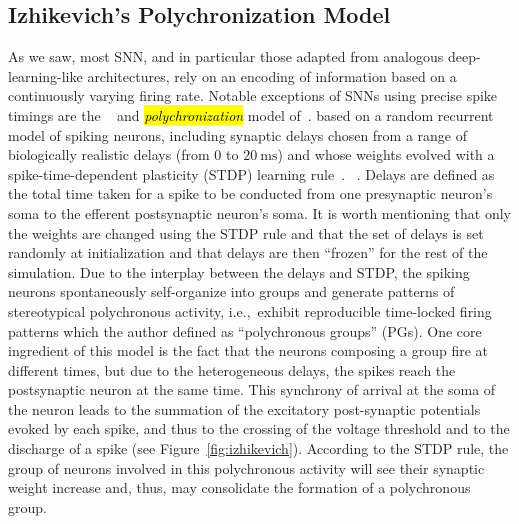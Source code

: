 \documentclass[brainsci, %
               review,accept,pdftex,moreauthors
               ]{Definitions/mdpi}
\newcommand{\ms}{\si{\milli\second}}%
\begin{document}
\subsection{Izhikevich's Polychronization Model}
As we saw, most SNN, and in particular those adapted from analogous deep-learning-like architectures, rely on an encoding of information based on a continuously varying firing rate. Notable exceptions of SNNs using precise spike timings are the ~\citet{lazar_time_2004} and \textit{\hl{polychronization}} model of~\citet{izhikevich_polychronization_2006}.  based on a random recurrent model of spiking neurons, including synaptic delays chosen from a range of biologically realistic delays (from $0$ to $20~\ms$) and whose weights evolved with a spike-time-dependent plasticity (STDP) learning rule~\citep{markram_regulation_1997}. ~\citep{caporale_spike_2008}. Delays are defined as the total time taken for a spike to be conducted from one presynaptic neuron's soma to the efferent postsynaptic neuron's soma. It is worth mentioning that only the weights are changed using the STDP rule and that the set of delays is set randomly at initialization and that delays are then ``frozen'' for the rest of the simulation. Due to the interplay between the delays and STDP, the spiking neurons spontaneously self-organize into groups and generate patterns of stereotypical polychronous activity, i.e.,~exhibit reproducible time-locked firing patterns which  the author defined as ``polychronous groups'' (PGs). One core ingredient of this model is the fact that the neurons composing a group fire at different times, but due to the heterogeneous delays, the spikes reach the postsynaptic neuron at the same time. This synchrony of arrival at the soma of the neuron leads to the summation of the excitatory post-synaptic potentials evoked by each spike, and thus to the crossing of the voltage threshold and to the discharge of a spike (see Figure~\ref{fig:izhikevich}). According to the STDP rule, the group of neurons involved in this polychronous activity will see their synaptic weight increase and, thus, may consolidate the formation of a polychronous group. 
%
\end{document}
